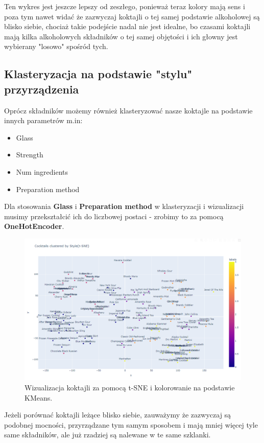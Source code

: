 \documentclass{article}
\begin{document}
Ten wykres jest jeszcze lepszy od zeszłego, ponieważ teraz kolory mają sens i poza tym nawet widać że zazwyczaj koktajli o tej samej podstawie alkoholowej są blisko siebie, chociaż takie podejście nadal nie jest idealne, bo czasami koktajli mają kilka alkoholowych składników o tej samej objętości i ich głowny jest wybierany "losowo" spośród tych.

\clearpage

\subsection{Klasteryzacja na podstawie "stylu" przyrządzenia}
Oprócz składników możemy również klasteryzować nasze koktajle na podstawie innych parametrów m.in:

\begin{itemize}
    \item Glass
    \item Strength
    \item Num ingredients
    \item Preparation method
\end{itemize}

Dla stosowania \textbf{Glass} i \textbf{Preparation method} w klasteryzacji i wizualizacji musimy przekształcić ich do liczbowej postaci - zrobimy to za pomocą \textbf{OneHotEncoder}.

\begin{figure}[h]
\centering
    \includegraphics[width=1\linewidth]{cluster_8.png}
    \caption{Wizualizacja koktajli za pomocą t-SNE i kolorowanie na podstawie KMeans.}
\end{figure}

Jeżeli porównać koktajli leżące blisko siebie, zauważymy że zazwyczaj są podobnej mocności, przyrządzane tym samym sposobem i mają mniej więcej tyle same składników, ale już rzadziej są nalewane w te same szklanki.
\end{document}
